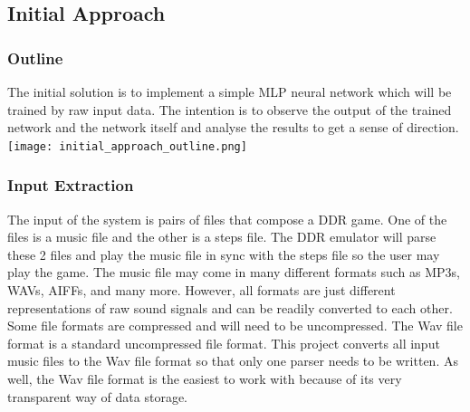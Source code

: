 \subsection{Initial Approach}
\subsubsection{Outline}

The initial solution is to implement a simple MLP neural network which will be trained by raw input data. The intention is to observe the output of the trained network and the network itself and analyse the results to get a sense of direction.\\

\texttt{[image: initial\_approach\_outline.png]}

\subsubsection{Input Extraction}

The input of the system is pairs of files that compose a DDR game. One of the files is a music file and the other is a steps file. The DDR emulator will parse these 2 files and play the music file in sync with the steps file so the user may play the game.
The music file may come in many different formats such as MP3s, WAVs, AIFFs, and many more. However, all formats are just different representations of raw sound signals and can be readily converted to each other. Some file formats are compressed and will need to be uncompressed. The Wav file format is a standard uncompressed file format. This project converts all input music files to the Wav file format so that only one parser needs to be written. As well, the Wav file format is the easiest to work with because of its very transparent way of data storage.\\

